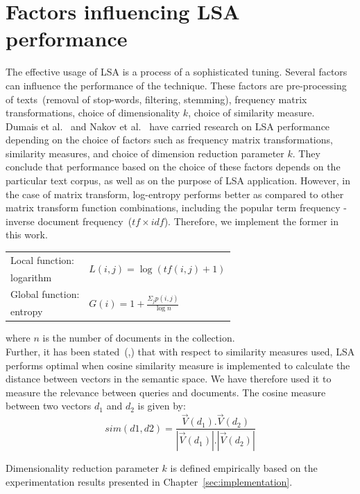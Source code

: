 \section{Factors influencing LSA performance}
\label{sec:lsa:factors_infl_lsa}
The effective usage of \gls{LSA} is a process of a sophisticated tuning. Several factors can influence the performance of the technique. These factors are pre-processing of texts~(removal of stop-words, filtering, stemming), frequency matrix transformations, choice of dimensionality $k$, choice of similarity measure.\\

Dumais et al.~\cite{dumais91improving} and Nakov et al.~\cite{Nakov_weightfunctions} have carried research on \gls{LSA} performance depending on the choice of factors such as frequency matrix transformations, similarity measures, and choice of dimension reduction parameter $k$. They conclude that performance based on the choice of these factors depends on the particular text corpus, as well as on the purpose of \gls{LSA} application. However, in the case of matrix transform, log-entropy performs better as compared to other matrix transform function combinations, including the popular term frequency - inverse document frequency~($tf\times idf$). Therefore, we implement the former in this work.
%
%
\begin{center}
\begin{tabular}{l l}
Local function:  & \multirow{2}{*}{ $ L(i,j)=\log(tf(i,j)+1) $ }\\
logarithm & \\
Global function: & \multirow{2}{*}{ $ G(i)=1+\frac{{\Sigma_{j}p(i,j)}}{\log n} $ } \\
entropy & \\
\end{tabular}
\end{center} 
where $n$ is the number of documents in the collection.\\

Further, it has been stated~(\cite{dumais91improving},\cite{NakovBetterResultsLSI}) that with respect to similarity measures used, \gls{LSA} performs optimal when cosine similarity measure is implemented to calculate the distance between vectors in the semantic space. We have therefore used it to measure the relevance between queries and documents. The cosine measure between two vectors $d_1$ and $d_2$ is given by:
%
%
\begin{equation}
\label{lsa:cosine_measure}
sim(d1,d2)=\frac{\overrightarrow{V}(d_1).\overrightarrow{V}(d_2)}{\left\vert \overrightarrow{V}(d_1) \right\vert.\left\vert \overrightarrow{V}(d_2)\right\vert}
\end{equation}

Dimensionality reduction parameter $k$ is defined empirically based on the experimentation results presented in Chapter~\ref{sec:implementation}. 
